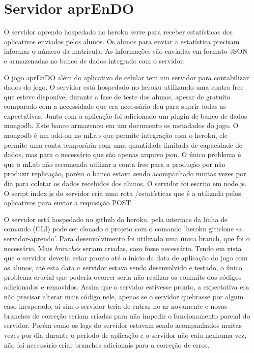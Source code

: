\section[Servidor aprEnDO]{Servidor aprEnDO}
O servidor aprendo hospedado no heroku serve para receber estatísticas dos aplicativos enviados pelos alunos. Os alunos para enviar a estatística precisam informar o número da matrícula. As informações são enviadas em formato JSON e armazenadas no banco de dados integrado com o servidor.

O jogo aprEnDO além do aplicativo de celular tem um servidor para contabilizar dados do jogo.
O servidor está hospedado no heroku utilizando uma contra free que esteve disponível durante a fase de teste dos alunos, apesar de gratuito comparado com a necessidade que era necessário deu para suprir todas as expectativas. Junto com a aplicação foi adicionado um plugin de banco de dados mongodb. Este banco armazenou em um documento os metadados do jogo. O mongodb é um add-on no mLab que permite integração com o heroku, ele permite uma conta temporária com uma quantidade limitada de capacidade de dados, mas para o necessário que são apenas arquivo json. O único problema é que  o mLab não recomenda utilizar a conta free para a produção por não produzir replicação, porém o banco estava sendo acompanhado muitas vezes por dia para coletar os dados recebidos dos alunos. 
O servidor foi escrito em node.js. O script index.js do servidor cria uma rota /estatísticas que é a utilizada pelos aplicativos para enviar a requisição POST. 

O servidor está hospedado no github do heroku, pela interface da linha de comando (CLI) pode ser clonado o projeto com o comando 'heroku git:clone -a servidor-aprendo'.
Para desenvolvimento foi utilizado uma única branch, que foi o necessário. Mais \textit{branches} seriam criadas, caso fosse necessário. Tendo em vista que o servidor deveria estar pronto até o início da data de aplicação do jogo com os alunos, até esta data o servidor estava sendo desenvolvido e testado, o único problema crucial que poderia ocorrer seria não realizar os commits dos códigos adicionados e removidos. Assim que o servidor estivesse pronto, a expectativa era não precisar alterar mais código nele, apenas se o servidor quebrasse por algum caso inesperado, aí sim o servidor teria de entrar no ar novamente e novas branches de correção seriam criadas para não impedir o funcionamento parcial do servidor. Porém como os logs do servidor estavam sendo acompanhados muitas vezes por dia durante o período de aplicação e o servidor não caiu nenhuma vez, não foi necessário criar branches adicionais para a correção de erros. 

